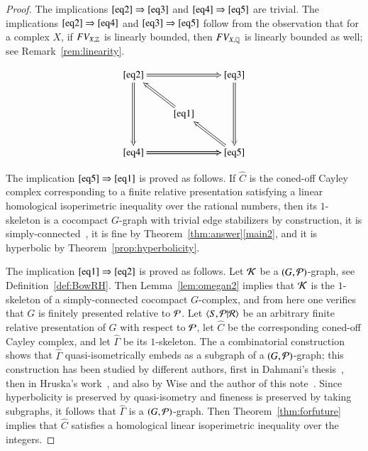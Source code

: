 \begin{proof}
The implications $\eqref{eq2} \Rightarrow \eqref{eq3}$ and $\eqref{eq4} \Rightarrow \eqref{eq5}$ are trivial. 
The implications $\eqref{eq2} \Rightarrow \eqref{eq4}$ and $\eqref{eq3} \Rightarrow \eqref{eq5}$ follow from the observation that   for a complex $X$, if $FV_{X, \mathbb{Z}}$ is linearly bounded, then $FV_{X, \mathbb{Q}}$ is linearly bounded as well; see Remark~\ref{rem:linearity}. 

\begin{equation}\nonumber \xymatrix{ 
 \eqref{eq2} \ar@{=>}[dd] \ar@{=>}[rr]  &  &  \eqref{eq3} \ar@{=>}[dd]\\
   &     \eqref{eq1} \ar@{=>}[lu] &  \\
 \eqref{eq4}  \ar@{=>}[rr] \ar@{=>}[rr] &  &  \eqref{eq5} \ar@{=>}[lu]
  }\end{equation}

The implication $\eqref{eq5} \Rightarrow \eqref{eq1}$ is proved as follows.
If $\hat C$ is the coned-off Cayley complex corresponding to a finite relative presentation satisfying a linear homological isoperimetric inequality over the rational numbers, then its $1$-skeleton is a cocompact $G$-graph with trivial edge stabilizers by construction, it is simply-connected~\cite[Lemma 2.48]{GrMa09},  it is fine by Theorem~\ref{thm:answer}\eqref{main2}, and it is hyperbolic by Theorem~\ref{prop:hyperbolicity}. 

The implication $\eqref{eq1} \Rightarrow \eqref{eq2}$ is proved as follows.
Let $\mathcal K$ be a $(G, \mathcal P)$-graph, see  Definition~\ref{def:BowRH}. Then Lemma~\ref{lem:omegan2} implies that $\mathcal K$ is the $1$-skeleton of a simply-connected cocompact $G$-complex, and from here one verifies that $G$ is finitely presented relative to $\mathcal P$. Let  $\langle S, \mathcal P | \mathcal R \rangle$ be an arbitrary finite relative presentation of $G$ with respect to $\mathcal P$,  let $\hat C$ be the corresponding coned-off Cayley complex, and let $\hat \Gamma$ be its $1$-skeleton.  The a combinatorial construction shows that $\hat \Gamma$ quasi-isometrically embeds as a subgraph of a $(G, \mathcal P)$-graph; this construction has been studied by different authors, first in Dahmani's thesis~\cite[Proof of Lemma A.4]{Da03}, then in Hruska's work~\cite[Proof of (R-H4) $\Rightarrow$ (RH-5)]{HK08}, and also by Wise and the author of this note~\cite[Proposition 4.3]{MaWi11}. Since hyperbolicity is preserved by quasi-isometry and fineness is preserved by taking subgraphs, it follows that $\hat \Gamma$ is a $(G, \mathcal P)$-graph. Then Theorem~\ref{thm:forfuture} implies that $\hat C$ satisfies a homological linear isoperimetric inequality over the integers. 
\end{proof}


